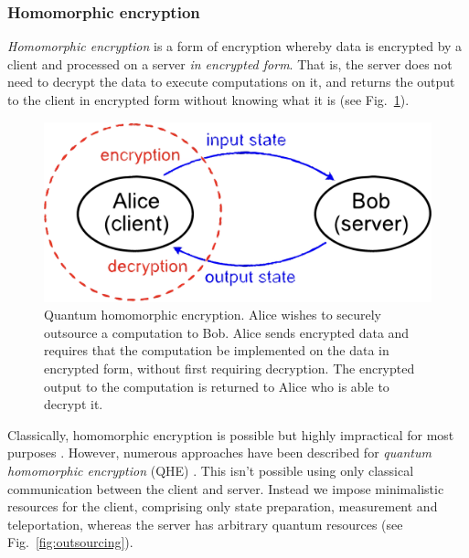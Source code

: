 \subsubsection{Homomorphic encryption} \label{homomorphic-encryption}

\emph{Homomorphic encryption} is a form of encryption whereby data is encrypted by a client and processed on a server \emph{in encrypted form}. That is, the server does not need to decrypt the data to execute computations on it, and returns the output to the client in encrypted form without knowing what it is (see Fig.~\ref{fig:QHE_model}).

\begin{figure}[!htb]
	\centering
	\includegraphics[width=\columnwidth]{figures/QHE}
	\caption{Quantum homomorphic encryption. Alice wishes to securely outsource a computation to Bob. Alice sends encrypted data and requires that the computation be implemented on the data in encrypted form, without first requiring decryption. The encrypted output to the computation is returned to Alice who is able to decrypt it.} \label{fig:QHE_model}
\end{figure}

Classically, homomorphic encryption is possible but highly impractical for most purposes \cite{bib:Gentry}. However, numerous approaches have been described for \emph{quantum homomorphic encryption} (QHE) \cite{bib:BJe15, bib:DSS16, bib:ouyang2020homomorphic, bib:TKOCF-qhe}. This isn't possible using only classical communication between the client and server. Instead we impose minimalistic resources for the client, comprising only state preparation, measurement and teleportation, whereas the server has arbitrary quantum resources (see Fig.~\ref{fig:outsourcing}).

